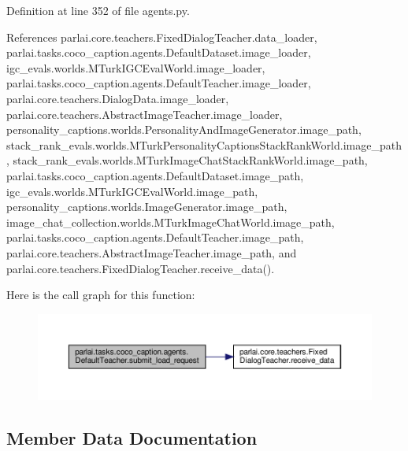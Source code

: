 Definition at line 352 of file agents.\+py.



References parlai.\+core.\+teachers.\+Fixed\+Dialog\+Teacher.\+data\+\_\+loader, parlai.\+tasks.\+coco\+\_\+caption.\+agents.\+Default\+Dataset.\+image\+\_\+loader, igc\+\_\+evals.\+worlds.\+M\+Turk\+I\+G\+C\+Eval\+World.\+image\+\_\+loader, parlai.\+tasks.\+coco\+\_\+caption.\+agents.\+Default\+Teacher.\+image\+\_\+loader, parlai.\+core.\+teachers.\+Dialog\+Data.\+image\+\_\+loader, parlai.\+core.\+teachers.\+Abstract\+Image\+Teacher.\+image\+\_\+loader, personality\+\_\+captions.\+worlds.\+Personality\+And\+Image\+Generator.\+image\+\_\+path, stack\+\_\+rank\+\_\+evals.\+worlds.\+M\+Turk\+Personality\+Captions\+Stack\+Rank\+World.\+image\+\_\+path, stack\+\_\+rank\+\_\+evals.\+worlds.\+M\+Turk\+Image\+Chat\+Stack\+Rank\+World.\+image\+\_\+path, parlai.\+tasks.\+coco\+\_\+caption.\+agents.\+Default\+Dataset.\+image\+\_\+path, igc\+\_\+evals.\+worlds.\+M\+Turk\+I\+G\+C\+Eval\+World.\+image\+\_\+path, personality\+\_\+captions.\+worlds.\+Image\+Generator.\+image\+\_\+path, image\+\_\+chat\+\_\+collection.\+worlds.\+M\+Turk\+Image\+Chat\+World.\+image\+\_\+path, parlai.\+tasks.\+coco\+\_\+caption.\+agents.\+Default\+Teacher.\+image\+\_\+path, parlai.\+core.\+teachers.\+Abstract\+Image\+Teacher.\+image\+\_\+path, and parlai.\+core.\+teachers.\+Fixed\+Dialog\+Teacher.\+receive\+\_\+data().

Here is the call graph for this function\+:
\nopagebreak
\begin{figure}[H]
\begin{center}
\leavevmode
\includegraphics[width=350pt]{classparlai_1_1tasks_1_1coco__caption_1_1agents_1_1DefaultTeacher_ac6b0eb2ddf6dcf03a750221b886ffd9b_cgraph}
\end{center}
\end{figure}


\subsection{Member Data Documentation}
\mbox{\label{classparlai_1_1tasks_1_1coco__caption_1_1agents_1_1DefaultTeacher_ad9f53dc5f0ebf3ef0fbd6755f060d533}} 
